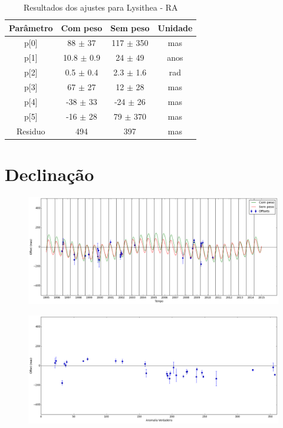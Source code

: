 \documentclass[11pt,a4paper]{report}
\begin{document}
\begin{table}[h!]
\caption{\label{Tab: Lysithea-RA} Resultados dos ajustes para Lysithea - RA}
\begin{centering}
\begin{tabular}{cccc}
\hline
\hline
Parâmetro & Com peso & Sem peso & Unidade\tabularnewline
\hline
p[0] & 88 $\pm$ 37 & 117 $\pm$ 350 & mas\\
p[1] & 10.8 $\pm$ 0.9 & 24 $\pm$ 49 & anos\\
p[2] & 0.5 $\pm$ 0.4 & 2.3 $\pm$ 1.6 & rad\\
p[3] & 67 $\pm$ 27 & 12 $\pm$ 28 & mas\\
p[4] & -38 $\pm$ 33 & -24 $\pm$ 26 & mas\\
p[5] & -16 $\pm$ 28 & 79 $\pm$ 370 & mas\\
Residuo & 494 & 397 & mas\\
\hline 
\end{tabular} 
\par\end{centering}
\end{table}

\section*{Declinação}

\begin{figure}[h]
\includegraphics[scale=0.35]{Lysithea/DEC.png} 
\end{figure}

\begin{figure}[h]
\includegraphics[scale=0.35]{Lysithea/DEC_anom.png}  
\end{figure}
\end{document}
